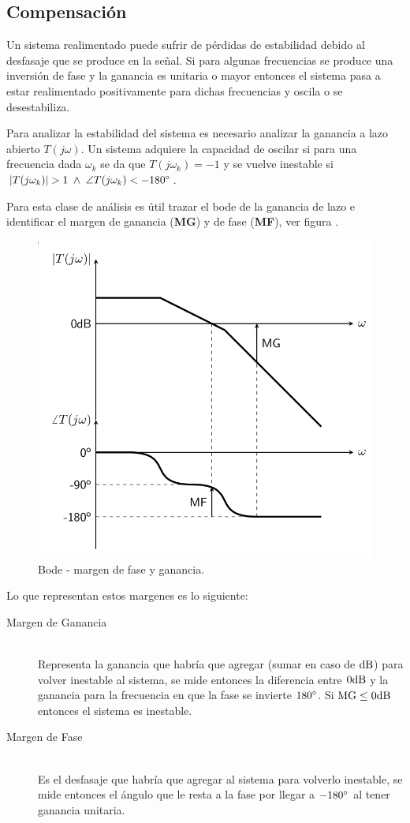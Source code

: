 \subsection{Compensación}

Un sistema realimentado puede sufrir de pérdidas de estabilidad debido al desfasaje que se produce en la señal. Si para algunas frecuencias se produce una inversión de fase y la ganancia es unitaria o mayor entonces el sistema pasa a estar realimentado positivamente para dichas frecuencias y oscila o se desestabiliza.

Para analizar la estabilidad del sistema es necesario analizar la ganancia a lazo abierto $T(j\omega)$. Un sistema adquiere la capacidad de oscilar si para una frecuencia dada $\omega_{k}$ se da que $T(j\omega_{k})=-1$ y se vuelve inestable si $\left| T(j\omega_{k}) \right| > 1 \; \land \; \angle T(j\omega_k) < -180 \si[per-mode=symbol]{\degree}$.

Para esta clase de análisis es útil trazar el bode de la ganancia de lazo e identificar el margen de ganancia (\textbf{MG}) y de fase (\textbf{MF}), ver figura .


\begin{figure}[H]
	\centering
	\includegraphics[height=0.35\textwidth]{img/margenes.png}
	\caption{Bode - margen de fase y ganancia.}
	\label{fig:margenes}
\end{figure}


Lo que representan estos margenes es lo siguiente:


\begin{description}
	\item[Margen de Ganancia] \hfill \\
		Representa la ganancia que habría que agregar (sumar en caso de $ \si[per-mode=symbol]{\decibel}$) para volver inestable al sistema, se mide entonces la diferencia entre $0 \si[per-mode=symbol]{\decibel}$ y la ganancia para la frecuencia en que la fase se invierte $180 \si[per-mode=symbol]{\degree}$. Si $\mathrm{MG} \le 0 \si[per-mode=symbol]{\decibel}$ entonces el sistema es inestable.

	\item[Margen de Fase] \hfill \\
		Es el desfasaje que habría que agregar al sistema para volverlo inestable, se mide entonces el ángulo que le resta a la fase por llegar a $ -180 \si[per-mode=symbol]{\degree}$ al tener ganancia unitaria.
\end{description}

